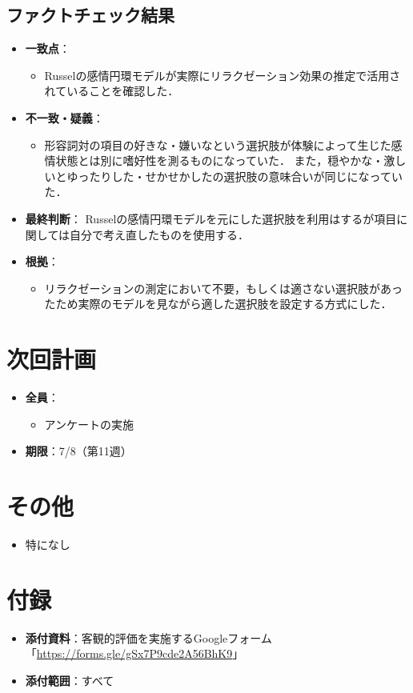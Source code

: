\documentclass[a4paper,12pt]{ltjsarticle}
\begin{document}
\subsection{ファクトチェック結果}
\begin{itemize}
  \item \textbf{一致点}：
    \begin{itemize}
      \item 
      Russelの感情円環モデルが実際にリラクゼーション効果の推定で活用されていることを確認した．
    \end{itemize}
  \item \textbf{不一致・疑義}：
    \begin{itemize}
      \item 
      形容詞対の項目の好きな・嫌いなという選択肢が体験によって生じた感情状態とは別に嗜好性を測るものになっていた．
      また，穏やかな・激しいとゆったりした・せかせかしたの選択肢の意味合いが同じになっていた．
    \end{itemize}
  \item \textbf{最終判断}：
  Russelの感情円環モデルを元にした選択肢を利用はするが項目に関しては自分で考え直したものを使用する．
  \item \textbf{根拠}：
    \begin{itemize}
      \item 
      リラクゼーションの測定において不要，もしくは適さない選択肢があったため実際のモデルを見ながら適した選択肢を設定する方式にした．
    \end{itemize}
\end{itemize}

\section{次回計画}

\begin{itemize}
  \item \textbf{全員}：
    \begin{itemize}
      \item アンケートの実施
    \end{itemize}
  \item \textbf{期限}：7/8（第11週）
\end{itemize}

\section{その他}

\begin{itemize}
  \item 特になし
\end{itemize}

\section{付録}

\begin{itemize}
  \item \textbf{添付資料}：客観的評価を実施するGoogleフォーム「\url{https://forms.gle/gSx7P9cde2A56BhK9}」
  \item \textbf{添付範囲}：すべて
\end{itemize}
\end{document}
